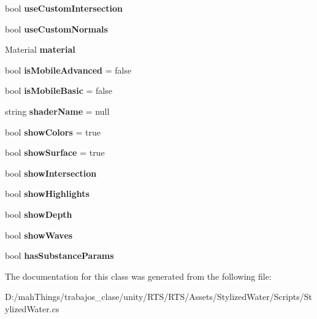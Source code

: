 \begin{DoxyCompactItemize}
bool {\bfseries use\+Custom\+Intersection}
\item 
\mbox{\label{class_stylized_water_a5d5e08ac41bc6f59cacf644697b13f95}} 
bool {\bfseries use\+Custom\+Normals}
\item 
\mbox{\label{class_stylized_water_ad3a7a4fcd19944d1d7d07f312630eca5}} 
Material {\bfseries material}
\item 
\mbox{\label{class_stylized_water_a78066c595902f720e432526dffb4fd4a}} 
bool {\bfseries is\+Mobile\+Advanced} = false
\item 
\mbox{\label{class_stylized_water_a5ad8dc69372111452ed83ae3ab718621}} 
bool {\bfseries is\+Mobile\+Basic} = false
\item 
\mbox{\label{class_stylized_water_a0978b14db3a2fe1020311c1881bba2ee}} 
string {\bfseries shader\+Name} = null
\item 
\mbox{\label{class_stylized_water_a55ad39962af7c179482fb79d6cf4e19c}} 
bool {\bfseries show\+Colors} = true
\item 
\mbox{\label{class_stylized_water_a963ebdd26ec72409e5339b7d17b760c6}} 
bool {\bfseries show\+Surface} = true
\item 
\mbox{\label{class_stylized_water_ab3d4febd3eddf5ee832e3b376590b6fc}} 
bool {\bfseries show\+Intersection}
\item 
\mbox{\label{class_stylized_water_a442da35a1deb2cab6749af1dca5e2816}} 
bool {\bfseries show\+Highlights}
\item 
\mbox{\label{class_stylized_water_afda74a2bc8b492c3cd02f82790428879}} 
bool {\bfseries show\+Depth}
\item 
\mbox{\label{class_stylized_water_ad049b3f2a0ca7d9b092c55f06c6a8661}} 
bool {\bfseries show\+Waves}
\item 
\mbox{\label{class_stylized_water_a4f264ea11cf47bfdaf5d0f99931aab95}} 
bool {\bfseries has\+Substance\+Params}
\end{DoxyCompactItemize}


The documentation for this class was generated from the following file\+:\begin{DoxyCompactItemize}
\item 
D\+:/mah\+Things/trabajos\+\_\+clase/unity/\+R\+T\+S/\+R\+T\+S/\+Assets/\+Stylized\+Water/\+Scripts/Stylized\+Water.\+cs\end{DoxyCompactItemize}
